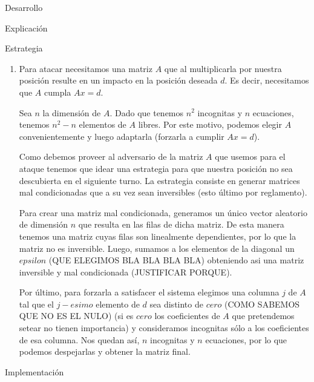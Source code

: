 \begin{section}{Desarrollo}
\begin{subsection}{Explicación}
\begin{subsubsection}{Estrategia}
\begin{enumerate}
\begin{itemize}
					Elegimos este método ya que las matrices son cuadradas y la implementación es sencilla.\\
					PONER MAS MOTIVOS COMO COMPLEJIDAD!!!!!!!!!!!!!!!!!!!!!!!!!!!!!!!!!!!!!!!!!!!!!!!!!!!!\\
				\end{itemize}
			
				La exactitud con la que la calculemos la posición buscada $y$ depende del número de condición de la matriz $A'$, y de este calculo entre otras cosas depende la exactitud de nuestro disparo.\\
				
				Como creemos que el adversario va a utilizar matrices mal condicionadas para atacarnos, en cada turno estariamos calculando una posición errada de donde se encuentra. Por este motivo, decidimos usar la estrategia de disparar en el punto promedio de todos las posiciones calculadas hasta el momento de donde se situa. Esperamos de esta manera ir obteniendo cada vez mejores aproximaciones a donde se encuentra realmente.
			
			
			\item Para atacar necesitamos una matriz $A$ que al multiplicarla por nuestra posición resulte en un impacto en la posición deseada $d$. Es decir, necesitamos que $A$ cumpla $Ax=d$.
			
			Sea $n$ la dimensión de $A$.
			Dado que tenemos $n^2$ incognitas y $n$ ecuaciones, tenemos $n^2-n$ elementos de $A$ libres. Por este motivo, podemos elegir $A$ convenientemente y luego adaptarla (forzarla a cumplir $Ax=d$).			
			
			Como debemos proveer al adversario de la matriz $A$ que usemos para el ataque tenemos que idear una estrategia para que nuestra posición no sea descubierta en el siguiente turno. La estrategia consiste en generar matrices mal condicionadas que a su vez sean inversibles (esto último por reglamento).
			
			Para crear una matriz mal condicionada, generamos un único vector aleatorio de dimensión $n$ que resulta en las filas de dicha matriz. De esta manera tenemos una matriz cuyas filas son linealmente dependientes, por lo que la matriz no es inversible. Luego, sumamos a los elementos de la diagonal un $epsilon$ (QUE ELEGIMOS BLA BLA BLA BLA) obteniendo asi una matriz inversible y mal condicionada (JUSTIFICAR PORQUE).
			
			Por último, para forzarla a satisfacer el sistema elegimos una columna $j$ de $A$ tal que el $j-esimo$ elemento de $d$ sea distinto de $cero$ (COMO SABEMOS QUE NO ES EL NULO) (si es $cero$ los coeficientes de $A$ que pretendemos setear no tienen importancia) y consideramos incognitas sólo a los coeficientes de esa columna. Nos quedan así, $n$ incognitas y $n$ ecuaciones, por lo que podemos despejarlas y obtener la matriz final.
			\end{enumerate}
		\end{subsubsection}
	\end{subsection}
	\begin{subsection}{Implementación}
		

\end{subsection}
\end{section}
